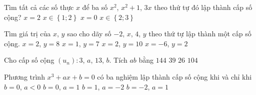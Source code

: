 \begin{ex}%
	Tìm tất cả các số thực $x$ để ba số $x^2$, $x^2+1$, $3x$ theo thứ tự đó lập thành  cấp số cộng?
	\choice 
		 {$x=2$}
		{\True $x\in  \left\{1;2\right\}$}
		{$x=0$} 
		{$x\in  \left\{2;3\right\}$}
\end{ex}

\begin{ex}%
	Tìm giá trị của $x$, $y$ sao cho dãy số $-2$, $x$, $4$, $y$ theo thứ  tự lập thành một cấp số cộng.
	 \choice
		{$x=2$, $y=8$} 
		{\True $x=1$,  $y=7$}
		 {$x=2$, $y=10$}
		{$x=-6$,  $y=2$}
\end{ex}

\begin{ex}%
	Cho cấp số cộng $\left(u_n\right)\colon 3$, $a$, $13$, $b$.  Tích $ab$ bằng
	\choice 
		 {\True $144$}
		 {$39$}
		 {$26$}
		 {$104$}
\end{ex}

\begin{ex}%
	Phương trình $x^3+ax+b=0$ có ba nghiệm lập thành cấp số cộng  khi và chỉ khi
	 \choice
		{\True $b=0$,  $a < 0$}
		{$b=0$,  $a=1$}
		 {$b=1$, $a=-2$}
		{$b=-2$, $a=1$} 
\end{ex}

